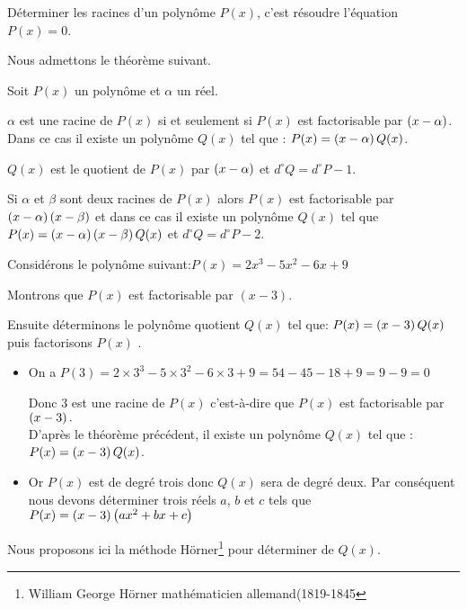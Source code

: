 \begin{remark}

 Déterminer les racines d'un polynôme $ P(x) $, c'est résoudre l'équation $ P(x)=0 $. 
\end{remark}

Nous admettons le théorème  suivant.

\begin{theorem}

Soit $ P(x) $  un polynôme  et $ \alpha $  un réel.

$ \alpha $  est une racine de $ P(x) $  si et seulement si $ P(x) $  est factorisable par $ \left(x-\alpha\right)$.\\ Dans ce cas il existe un polynôme $ Q(x) $ tel que : $  P(x)=\left(x-\alpha\right)Q(x) $.

$ Q(x) $  est le quotient de  $ P(x) $ par $ \left(x-\alpha\right)$  et $ d^{\circ}Q=d^{\circ}P-1 $.

\end{theorem}
\begin{remark}

 Si $\alpha $ et $\beta $ sont deux racines de  $ P(x) $  alors  $ P(x) $ est factorisable par $ \left(x-\alpha\right) \left(x-\beta\right) $ et dans ce cas il existe un polynôme $ Q(x)$  tel que $  P(x)=\left(x-\alpha\right)\left(x-\beta\right)Q(x) $  et $ d^{\circ}Q=d^{\circ}P-2 $.
\end{remark}
\begin{example}

Considérons le polynôme suivant:\;$ P(x)=  2x^{3}-5x^{2}-6x+9 $

 Montrons que $ P(x) $  est factorisable par $ (x-3) $.
 
 Ensuite déterminons le polynôme quotient $ Q(x) $ tel que: $  P(x)=\left(x-3\right)Q(x) $ puis factorisons $ P(x) $ .
\end{example}

\begin{itemize}
\item  On a $ P(3)=  2\times 3^{3}-5\times 3^{2}-6\times 3+9 = 54-45 -18 +9=9-9=0$

Donc 3 est une racine de $ P(x) $  c'est-à-dire que $ P(x) $  est factorisable par $ \left(x-3\right).$ \\D'après le théorème précédent, il existe un polynôme $ Q(x) $ tel que :                         $  P(x)=\left(x-3\right)Q(x) $.


 \item  Or  $ P(x) $  est de degré trois donc $ Q(x) $ sera de degré  deux. Par conséquent nous devons déterminer trois réels $ a$, $ b $  et $ c$ tels que 
$  P(x)=\left(x-3\right)\left(ax^{2} +bx +c\right) $ 
\end{itemize}
 Nous proposons ici la  méthode  Hörner\footnote{William George Hörner mathématicien allemand(1819-1845}  pour  déterminer de $ Q(x) $.
 \bigskip
 
